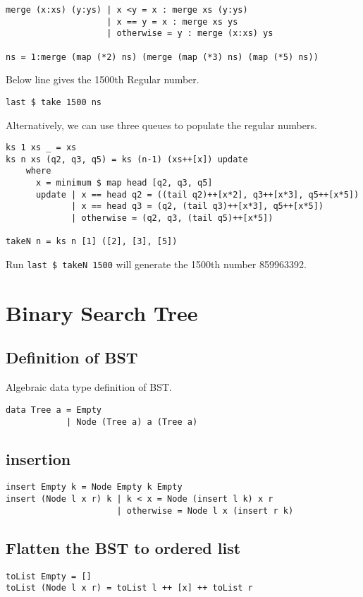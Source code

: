 \documentclass{article}
\begin{document}
\begin{lstlisting}
merge (x:xs) (y:ys) | x <y = x : merge xs (y:ys)
                    | x == y = x : merge xs ys
                    | otherwise = y : merge (x:xs) ys

ns = 1:merge (map (*2) ns) (merge (map (*3) ns) (map (*5) ns))
\end{lstlisting}

Below line gives the 1500th Regular number.
\begin{verbatim}
last $ take 1500 ns
\end{verbatim}

Alternatively, we can use three queues to populate the regular numbers.

\begin{lstlisting}
ks 1 xs _ = xs
ks n xs (q2, q3, q5) = ks (n-1) (xs++[x]) update
    where
      x = minimum $ map head [q2, q3, q5]
      update | x == head q2 = ((tail q2)++[x*2], q3++[x*3], q5++[x*5])
             | x == head q3 = (q2, (tail q3)++[x*3], q5++[x*5])
             | otherwise = (q2, q3, (tail q5)++[x*5])

takeN n = ks n [1] ([2], [3], [5])
\end{lstlisting}

Run \texttt{last \$ takeN 1500} will generate the 1500th number 859963392.

\section{Binary Search Tree}

\subsection{Definition of BST}

Algebraic data type definition of BST.

\begin{lstlisting}
data Tree a = Empty
            | Node (Tree a) a (Tree a)
\end{lstlisting}

\subsection{insertion}

\begin{lstlisting}
insert Empty k = Node Empty k Empty
insert (Node l x r) k | k < x = Node (insert l k) x r
                      | otherwise = Node l x (insert r k)
\end{lstlisting}

\subsection{Flatten the BST to ordered list}

\begin{lstlisting}
toList Empty = []
toList (Node l x r) = toList l ++ [x] ++ toList r
\end{lstlisting}

\ifx\wholebook\relax \else
\end{document}

